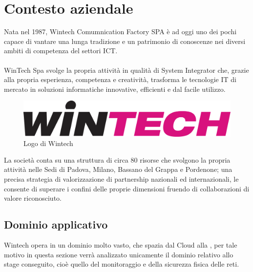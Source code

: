 \documentclass[Tesi.tex]{subfiles}
\begin{document}
\setcounter{chapter}{0}
\chapter{Contesto aziendale}

Nata nel 1987, Wintech Comumnication Factory SPA è ad oggi uno dei pochi  capace di vantare una lunga tradizione e un patrimonio di conoscenze nei diversi ambiti di competenza del settori ICT. \\\\
WinTech Spa svolge la propria attività in qualità di System Integrator che, grazie alla propria esperienza, competenza e creatività, trasforma le tecnologie IT di mercato in soluzioni informatiche innovative, efficienti e dal facile utilizzo.\\
\begin{figure}[H]
	\centering
	\includegraphics[width=0.9\linewidth]{"images/LogoWintech"}
	\caption{Logo di Wintech}
	\label{fig:Logo di Wintech}
\end{figure}

La società conta su una struttura di circa 80 risorse che svolgono la propria attività nelle Sedi di Padova, Milano, Bassano del Grappa e Pordenone; una precisa strategia di valorizzazione di partnership nazionali ed internazionali, le consente di superare i confini delle proprie dimensioni fruendo di collaborazioni di valore riconosciuto.\\

\newpage
\section{Dominio applicativo}
Wintech opera in un dominio molto vasto, che spazia dal Cloud alla , per tale motivo in questa sezione verrà analizzato unicamente il dominio relativo allo stage conseguito, cioè quello del monitoraggio e della sicurezza fisica delle reti. \\
\end{document}
